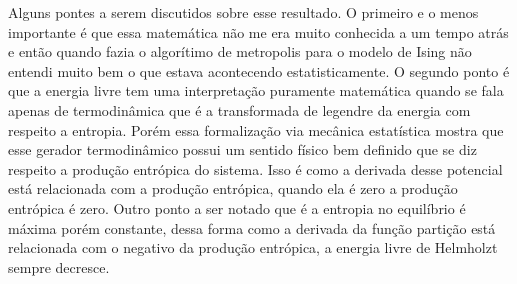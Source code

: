 \documentclass[12pt]{article}
\begin{document}
Alguns pontes a serem discutidos sobre esse resultado. 
O primeiro e o menos importante é que essa matemática não me era muito conhecida a um tempo atrás e então quando fazia o algorítimo de metropolis para o modelo de Ising não entendi muito bem o que estava acontecendo estatisticamente. O segundo ponto é que a energia livre tem uma interpretação puramente matemática quando se fala apenas de termodinâmica que é a transformada de legendre da energia com respeito a entropia. Porém essa formalização via mecânica estatística mostra que esse gerador termodinâmico possui um sentido físico bem definido que se diz respeito a produção entrópica do sistema. Isso é como a derivada desse potencial está relacionada com a produção entrópica, quando ela é zero a produção entrópica é zero. Outro ponto a ser notado que é a entropia no equilíbrio é máxima porém constante, dessa forma como a derivada da função partição está relacionada com o negativo da produção entrópica, a energia livre de Helmholzt sempre decresce.  
\end{document}
